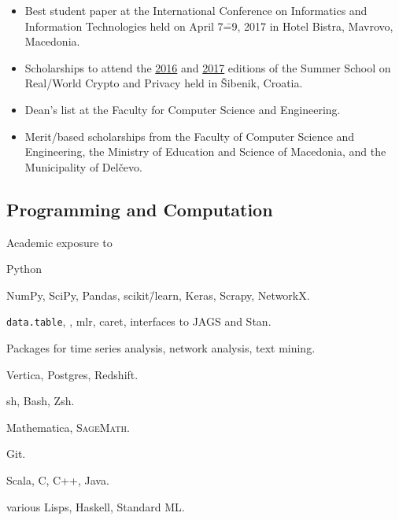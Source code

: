 \documentclass[version=last, fontsize=10pt, paper=A4, toc=bibliography]{scrartcl}%
\begin{document}
\label{sec:honors-achievements}

\begin{itemize}
\item Best student paper at the  International Conference on Informatics
  and Information Technologies held on April 7\==9, 2017 in Hotel Bistra,
  Mavrovo, Macedonia.
\item Scholarships to attend the
  \href{http://summerschool-croatia.cs.ru.nl/2016/}{2016} and
  \href{http://summerschool-croatia.cs.ru.nl/2017/}{2017} editions of the Summer
  School on Real\-/World Crypto and Privacy held in Šibenik, Croatia.
\item Dean's list at the Faculty for Computer Science and Engineering.
\item Merit\-/based scholarships from the Faculty of Computer Science and
  Engineering, the Ministry of Education and Science of Macedonia, and the
  Municipality of Delčevo.
\end{itemize}

\label{sec:skills}

\subsection*{Programming and
  Computation}\label{subsec:programming-computation}

\begingroup
{}%
\begin{labeling}[~\==]{Academic exposure to}
\item[Proficient with]
  \begingroup
  \begin{labeling}[~\==]{Python}
  \item[Python] NumPy, SciPy, Pandas, scikit\=/learn, Keras, Scrapy, NetworkX.
  \item[R] \texttt{data.table}, , mlr, caret,
    interfaces to JAGS and Stan.

    Packages for time series analysis, network analysis, text mining.
  \item[SQL] Vertica, Postgres, Redshift.
  \item[Shell] sh, Bash, Zsh.
  \item[CAS] Mathematica\textregistered, \textsc{SageMath}.
  \item[(D)VCS] Git.%
  \end{labeling}
  \endgroup
\item[Familiar with] Scala, C, C++, Java.
\item[Academic exposure to] various Lisps, Haskell, Standard ML\@.
\end{labeling}
\endgroup
\end{document}
